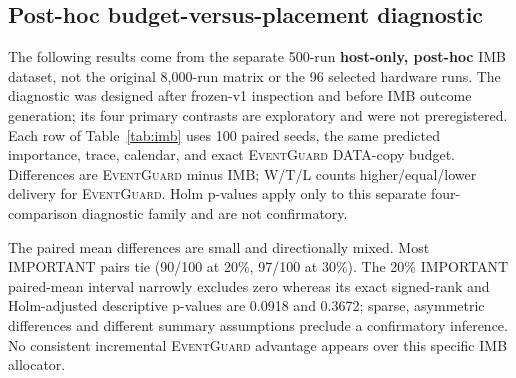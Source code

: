 \documentclass[11pt]{article}
\newcommand{\EG}{\textsc{EventGuard}}
\begin{document}
\clearpage

\subsection{Post-hoc budget-versus-placement diagnostic}\label{sec:imb-results}

The following results come from the separate 500-run \textbf{host-only, post-hoc} IMB dataset, not the original 8,000-run matrix or the 96 selected hardware runs. The diagnostic was designed after frozen-v1 inspection and before IMB outcome generation; its four primary contrasts are exploratory and were not preregistered. Each row of Table~\ref{tab:imb} uses 100 paired seeds, the same predicted importance, trace, calendar, and exact \EG{} DATA-copy budget. Differences are \EG{} minus IMB; W/T/L counts higher/equal/lower delivery for \EG{}. Holm p-values apply only to this separate four-comparison diagnostic family and are not confirmatory.

\begin{table}[t]
\centering
\small
\caption{Post-hoc importance-matched-budget diagnostic under deterministic, software-injected \texttt{RANDOM\_COPY}. Mean delivery ratios and paired-mean 95\% CIs use 100 seeds. DATA-copy budget is matched in every seed; total bytes may differ with ACK activity.}
\label{tab:imb}
\end{table}

The paired mean differences are small and directionally mixed. Most IMPORTANT pairs tie (90/100 at 20\%, 97/100 at 30\%). The 20\% IMPORTANT paired-mean interval narrowly excludes zero whereas its exact signed-rank and Holm-adjusted descriptive p-values are 0.0918 and 0.3672; sparse, asymmetric differences and different summary assumptions preclude a confirmatory inference. No consistent incremental \EG{} advantage appears over this specific IMB allocator.
\end{document}
